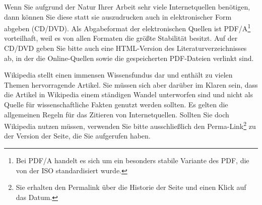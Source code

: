 Wenn Sie aufgrund der Natur Ihrer Arbeit sehr viele Internetquellen benötigen, dann können Sie diese statt sie auszudrucken auch in elektronischer Form abgeben (CD/DVD). Als Abgabeformat der elektronischen Quellen ist PDF/A\footnote{Bei PDF/A handelt es sich um ein besonders stabile Variante des \ac{PDF}, die von der  \ac{ISO} standardisiert wurde.} vorteilhaft, weil es von allen Formaten die größte Stabilität besitzt.
Auf der CD/DVD geben Sie bitte auch eine HTML-Version des Literaturverzeichnisses ab, in der die Online-Quellen sowie die gespeicherten PDF-Dateien verlinkt sind.

Wikipedia stellt einen immensen Wissensfundus dar und enthält zu vielen Themen hervorragende Artikel. Sie müssen sich aber darüber im Klaren sein, dass die Artikel in Wikipedia einem ständigen Wandel unterworfen sind und nicht als Quelle für wissenschaftliche Fakten genutzt werden sollten. Es gelten die allgemeinen Regeln für das Zitieren von Internetquellen. Sollten Sie doch Wikipedia nutzen müssen, verwenden Sie bitte ausschließlich den Perma-Link\footnote{Sie erhalten den Permalink über die Historie der Seite und einen Klick auf das Datum.} zu der Version der Seite, die Sie aufgerufen haben.


